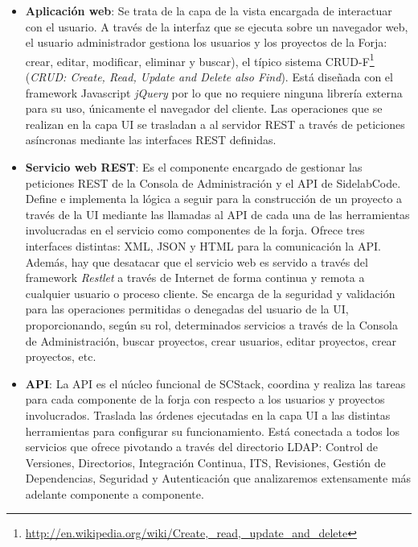 \begin{itemize}
	\item \textbf{Aplicación web}: Se trata de la capa de la vista encargada de interactuar con el usuario. A través de la interfaz que se ejecuta sobre un navegador web, el usuario administrador gestiona los usuarios y los proyectos de la Forja: crear, editar, modificar, eliminar y buscar), el típico sistema CRUD-F\footnote{\url{http://en.wikipedia.org/wiki/Create,\_read,\_update\_and\_delete}} (\emph{CRUD: Create, Read, Update and Delete also Find}). Está diseñada con el framework Javascript \emph{jQuery} por lo que no requiere ninguna librería externa para su uso, únicamente el navegador del cliente. Las operaciones que se realizan en la capa UI se trasladan a al servidor REST a través de peticiones asíncronas mediante las interfaces REST definidas.

    \item \textbf{Servicio web REST}: Es el componente encargado de gestionar las peticiones REST de la Consola de Administración y el API de SidelabCode. Define e implementa la lógica a seguir para la construcción de un proyecto a través de la UI mediante las llamadas al API de cada una de las herramientas involucradas en el servicio como componentes de la forja.
    Ofrece tres interfaces distintas: XML, JSON y HTML para la comunicación la API. Además, hay que desatacar que el servicio web es servido a través del framework \emph{Restlet} a través de Internet de forma continua y remota a cualquier usuario o proceso cliente.
    Se encarga de la seguridad y validación para las operaciones permitidas o denegadas del usuario de la UI, proporcionando, según su rol, determinados servicios a través de la Consola de Administración, buscar proyectos, crear usuarios, editar proyectos, crear proyectos, etc.

    \item \textbf{API}: La API es el núcleo funcional de SCStack, coordina y realiza las tareas para cada componente de la forja con respecto a los usuarios y proyectos involucrados. Traslada las órdenes ejecutadas en la capa UI a las distintas herramientas para configurar su funcionamiento. Está conectada a todos los servicios que ofrece pivotando a través del directorio LDAP: Control de Versiones, Directorios, Integración Continua, ITS, Revisiones, Gestión de Dependencias, Seguridad y Autenticación que analizaremos extensamente más adelante componente a componente.

\end{itemize}

